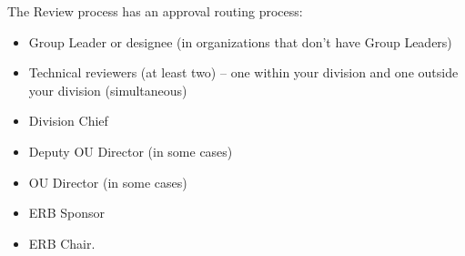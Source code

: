 The Review process has an approval routing process:
\begin{itemize}
\item 
Group Leader or designee (in organizations that don't have Group Leaders)
\item Technical reviewers (at least two) – one within your division and one outside your division (simultaneous)
\item Division Chief
\item Deputy OU Director (in some cases)
\item OU Director (in some cases)
\item ERB Sponsor
\item ERB Chair.
\end{itemize}